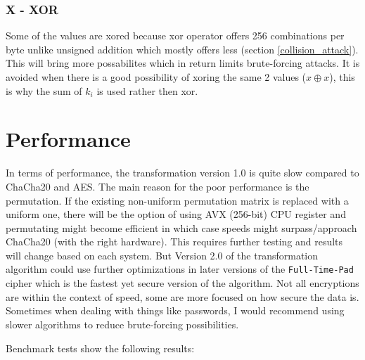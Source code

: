 \documentclass[fleqn, a4paper,12pt]{article}
\begin{document}
\subsubsection{X - XOR} %

Some of the values are xored because xor operator offers 256 combinations per byte unlike unsigned addition which mostly offers less (section \ref{collision_attack}). This will bring more possabilites which in return limits brute-forcing attacks. It is avoided when there is a good possibility of xoring the same 2 values ($x \oplus x$), this is why the sum of $k_i$ is used rather then xor.

\section{Performance}

In terms of performance, the transformation version 1.0 is quite slow compared to ChaCha20 and AES. The main reason for the poor performance is the permutation. If the existing non-uniform permutation matrix is replaced with a uniform one, there will be the option of using AVX (256-bit) CPU register and permutating might become efficient in which case speeds might surpass/approach ChaCha20 (with the right hardware). This requires further testing and results will change based on each system. But Version 2.0 of the transformation algorithm could use further optimizations in later versions of the \texttt{Full-Time-Pad} cipher which is the fastest yet secure version of the algorithm. Not all encryptions are within the context of speed, some are more focused on how secure the data is. Sometimes when dealing with things like passwords, I would recommend using slower algorithms to reduce brute-forcing possibilities.

Benchmark tests show the following results: 
\end{document}
